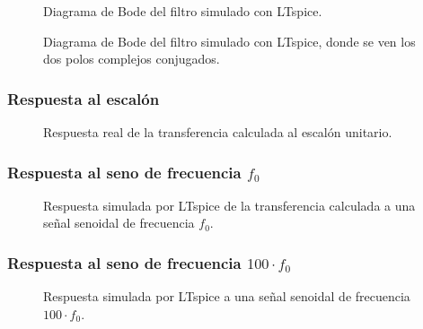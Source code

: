 \documentclass[10pt,a4paper]{article}
\begin{document}
    \begin{figure}[H]
        \centering
        \scalebox{0.9}{}
        \caption{Diagrama de Bode del filtro simulado con LTspice.}
        \label{fig}
    \end{figure}

    \begin{figure}[H]
        \centering
        \scalebox{0.9}{}
        \caption{Diagrama de Bode del filtro simulado con LTspice, donde se ven los dos polos complejos conjugados.}
        \label{fig}
    \end{figure}

    \subsubsection{Respuesta al escalón}


    \begin{figure}[H]
        \centering
        \scalebox{0.85}{}
        \caption{Respuesta real de la transferencia calculada al escalón unitario.}
        \label{fig}
    \end{figure}











    \subsubsection{Respuesta al seno de frecuencia $f_0$}
    \begin{figure}[H]
        \centering
        \scalebox{0.85}{}
        \caption{Respuesta simulada por LTspice de la transferencia calculada a una señal senoidal de frecuencia $f_0$.}
        \label{fig}
    \end{figure}

    \subsubsection{Respuesta al seno de frecuencia $100\cdot f_0$}
    \begin{figure}[H]
        \centering
        \scalebox{0.85}{}
        \caption{Respuesta simulada por LTspice a una señal senoidal de frecuencia $100 \cdot f_0$.}
        \label{fig}
    \end{figure}
\end{document}
